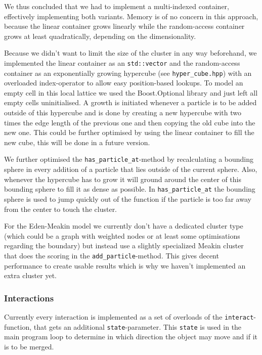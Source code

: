 \documentclass[twocolumn,10pt]{scrartcl}
\begin{document}
                We thus concluded that we had to implement a multi-indexed container, effectively implementing both
                variants. Memory is of no concern in this approach, because the linear container grows linearly while
                the random-access container grows at least quadratically, depending on the dimensionality.

                Because we didn't want to limit the size of the cluster in any way beforehand, we implemented the linear
                container as an \lstinline'std::vector' and the random-access container as an exponentially growing
                hypercube (see \lstinline'hyper_cube.hpp') with an overloaded index-operator to allow easy
                position-based lookups. To model an empty cell in this local lattice we used the Boost.Optional
                library\cite{boost-optional} and just left all empty cells uninitialised. A growth is initiated whenever
                a particle is to be added outside of this hypercube and is done by creating a new hypercube with two
                times the edge length of the previous one and then copying the old cube into the new one. This could be
                further optimised by using the linear container to fill the new cube, this will be done in a future
                version.

                We further optimised the \lstinline'has_particle_at'-method by recalculating a bounding sphere in every
                addition of a particle that lies outside of the current sphere. Also, whenever the hypercube has to grow
                it will ground around the center of this bounding sphere to fill it as dense as possible. In
                \lstinline'has_particle_at' the bounding sphere is used to jump quickly out of the function if the
                particle is too far away from the center to touch the cluster.

                For the Eden-Meakin model we currently don't have a dedicated cluster type (which could be a graph with
                weighted nodes or at least some optimisations regarding the boundary) but instead use a slightly
                specialized Meakin cluster that does the scoring in the \lstinline'add_particle'-method. This gives
                decent performance to create usable results which is why we haven't implemented an extra cluster yet.

            \subsubsection{Interactions}
                Currently every interaction is implemented as a set of overloads of the \lstinline'interact'-function,
                that gets an additional \lstinline'state'-parameter. This \lstinline'state' is used in the main program
                loop to determine in which direction the object may move and if it is to be merged.
\end{document}
